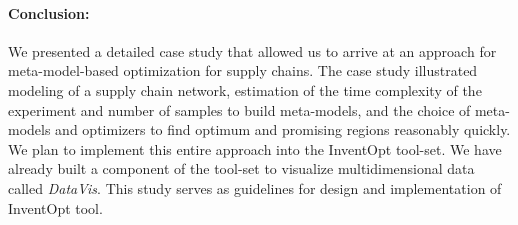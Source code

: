 

\paragraph{Conclusion:} We presented a detailed case study that allowed us to arrive at an approach for meta-model-based optimization for supply chains. The case study illustrated modeling of a supply chain network, estimation of the time complexity of the experiment and number of samples to build meta-models, and the choice of meta-models and optimizers to find optimum and promising regions reasonably quickly. We plan to implement this entire approach into the InventOpt tool-set. We have already built a component of the tool-set to visualize multidimensional data called \textit{DataVis}. This study serves as guidelines for design and implementation of InventOpt tool.